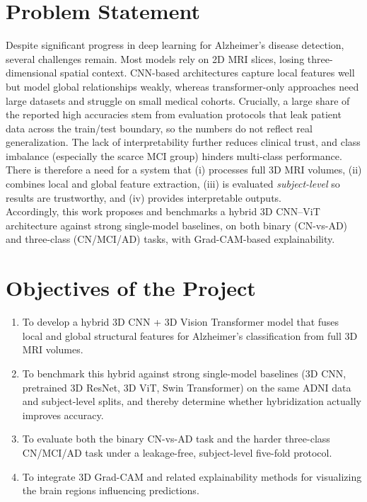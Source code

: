 \section{Problem Statement}
Despite significant progress in deep learning for Alzheimer's disease detection, several challenges remain. Most models rely on 2D MRI slices, losing three-dimensional spatial context. CNN-based architectures capture local features well but model global relationships weakly, whereas transformer-only approaches need large datasets and struggle on small medical cohorts. Crucially, a large share of the reported high accuracies stem from evaluation protocols that leak patient data across the train/test boundary, so the numbers do not reflect real generalization. The lack of interpretability further reduces clinical trust, and class imbalance (especially the scarce MCI group) hinders multi-class performance.\\
There is therefore a need for a system that (i) processes full 3D MRI volumes, (ii) combines local and global feature extraction, (iii) is evaluated \emph{subject-level} so results are trustworthy, and (iv) provides interpretable outputs.\\
Accordingly, this work proposes and benchmarks a hybrid 3D CNN–ViT architecture against strong single-model baselines, on both binary (CN-vs-AD) and three-class (CN/MCI/AD) tasks, with Grad-CAM-based explainability.

\section{Objectives of the Project}
\begin{enumerate}
    \item To develop a hybrid 3D CNN + 3D Vision Transformer model that fuses local and global structural features for Alzheimer's classification from full 3D MRI volumes.
    \item To benchmark this hybrid against strong single-model baselines (3D CNN, pretrained 3D ResNet, 3D ViT, Swin Transformer) on the same ADNI data and subject-level splits, and thereby determine whether hybridization actually improves accuracy.
    \item To evaluate both the binary CN-vs-AD task and the harder three-class CN/MCI/AD task under a leakage-free, subject-level five-fold protocol.
    \item To integrate 3D Grad-CAM and related explainability methods for visualizing the brain regions influencing predictions.
\end{enumerate}

